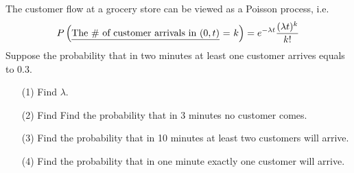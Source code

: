 \noindent {}
The customer flow at a grocery store can be viewed as a Poisson process, i.e.
\[
    P\left(\text{\underline{The \# of customer arrivals in $(0, t)$} = $k$}\right) = e^{-\lambda t} \frac{(\lambda t)^k}{k!}
\]
Suppose the probability that in two minutes at least one customer arrives equals to 0.3.
\begin{enumerate}
    \item[(1)] Find $\lambda$. \\
    \item[(2)] Find Find the probability that in 3 minutes no customer comes. \\
    \item[(3)] Find the probability that in 10 minutes at least two customers will arrive. \\
    \item[(4)] Find the probability that in one minute exactly one customer will arrive. \\
\end{enumerate}
